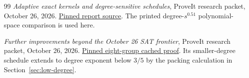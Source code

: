 \begin{thebibliography}{99}
\emph{Adaptive exact kernels and degree-sensitive schedules}, ProveIt
research packet, October 26, 2026.
\href{https://github.com/VladimirReshetnikov/ProveIt/blob/8e76d515063c4b9fbd8743a846b457e3a01bc039/Computability/SubexponentialSAT/Research/eth_adaptive_exact_kernels/report.tex}{Pinned report source}.
The printed degree-$s^{0.51}$ polynomial-space comparison is used here.

\emph{Further improvements beyond the October 26 SAT frontier}, ProveIt
research packet, October 26, 2026.
\href{https://github.com/VladimirReshetnikov/ProveIt/blob/8e76d515063c4b9fbd8743a846b457e3a01bc039/Computability/SubexponentialSAT/Research/sat_frontier_improvements/sections/cache_composition.tex}{Pinned eight-group cached proof}.
Its smaller-degree schedule extends to degree exponent below $3/5$ by the
packing calculation in Section~\ref{sec:low-degree}.

\end{thebibliography}


